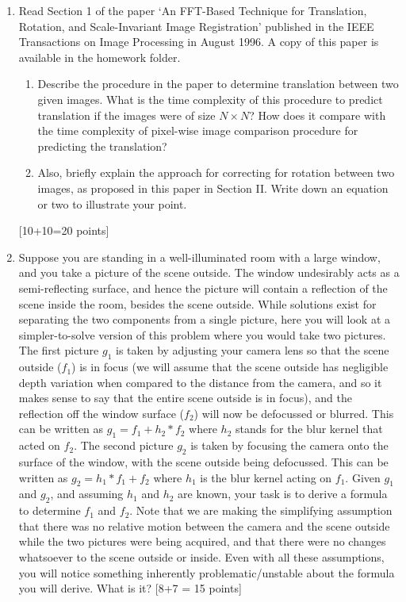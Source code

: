 \documentclass[11pt]{article}
\begin{document}
\begin{enumerate}
\item Read Section 1 of the paper `An FFT-Based Technique for Translation, Rotation, and Scale-Invariant Image Registration' published in the IEEE Transactions on Image Processing in August 1996. A copy of this paper is available in the homework folder. 
\begin{enumerate}
\item Describe the procedure in the paper to determine translation between two given images. What is the time complexity of this procedure to predict translation if the images were of size $N \times N$? How does it compare with the time complexity of pixel-wise image comparison procedure for predicting the translation? 
\item Also, briefly explain the approach for correcting for rotation between two images, as proposed in this paper in Section II. Write down an equation or two to illustrate your point.
\end{enumerate} \textsf{[10+10=20 points]}

\item Suppose you are standing in a well-illuminated room with a large window, and you take a picture of the scene outside. The window undesirably acts as a semi-reflecting surface, and hence the picture will contain a reflection of the scene inside the room, besides the scene outside. While solutions exist for separating the two components from a single picture, here you will look at a simpler-to-solve version of this problem where you would take two pictures. The first picture $g_1$ is taken by adjusting your camera lens so that the scene outside ($f_1$) is in focus (we will assume that the scene outside has negligible depth variation when compared to the distance from the camera, and so it makes sense to say that the entire scene outside is in focus), and the reflection off the window surface ($f_2$) will now be defocussed or blurred.  This can be written as $g_1 = f_1 + h_2 * f_2$ where $h_2$ stands for the blur kernel that acted on $f_2$. The second picture $g_2$ is taken by focusing the camera onto the surface of the window, with the scene outside being defocussed. This can be written as $g_2 = h_1 * f_1 + f_2$ where $h_1$ is the blur kernel acting on $f_1$. Given $g_1$ and $g_2$, and assuming $h_1$ and $h_2$ are known, your task is to derive a formula to determine $f_1$ and $f_2$. Note that we are making the simplifying assumption that there was no relative motion between the camera and the scene outside while the two pictures were being acquired, and that there were no changes whatsoever to the scene outside or inside. Even with all these assumptions, you will notice something inherently problematic/unstable about the formula you will derive. What is it? \textsf{[8+7 = 15 points]}


\end{enumerate}
\end{document}
